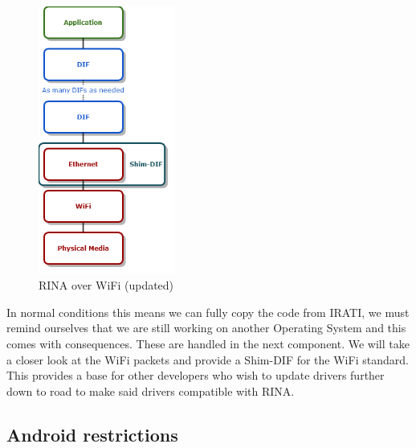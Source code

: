 \begin{figure}[H]
    \centering
    \includegraphics[width=0.4\textwidth]{figures/rinaoverwifi2}
    \caption{RINA over WiFi (updated)} 
    \label{fig:rinaoverwifi2}
\end{figure}

\npar
In normal conditions this means we can fully copy the code from IRATI, we must remind ourselves that we are still working on another Operating System and this comes with consequences. These are handled in the next component. We will take a closer look at the WiFi packets and provide a Shim-DIF for the WiFi standard. This provides a base for other developers who wish to update drivers further down to road to make said drivers compatible with RINA. 

\subsection{Android restrictions}

